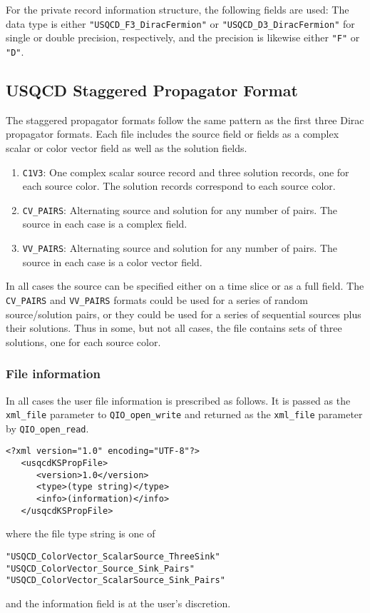 \documentclass{article}
\begin{document}
For the private record information structure, the following fields are
used: The data type is either \verb|"USQCD_F3_DiracFermion"| or
\verb|"USQCD_D3_DiracFermion"| for single or double precision,
respectively, and the precision is likewise either \verb|"F"| or
\verb|"D"|.

\subsection{USQCD Staggered Propagator Format}

The staggered propagator formats follow the same pattern as the first
three Dirac propagator formats.  Each file includes the source field
or fields as a complex scalar or color vector field as well as the
solution fields.
%
\begin{enumerate}
\item \verb|C1V3|: One complex scalar source record and three
  solution records, one for each source color.  The solution records
  correspond to each source color.
\item \verb|CV_PAIRS|: Alternating source and solution for any number
  of pairs.  The source in each case is a complex field.
\item \verb|VV_PAIRS|: Alternating source and solution for any number
  of pairs.  The source in each case is a color vector field.
\end{enumerate}
%
In all cases the source can be specified either on a time slice or as
a full field.  The \verb|CV_PAIRS| and \verb|VV_PAIRS| formats could
be used for a series of random source/solution pairs, or they could be
used for a series of sequential sources plus their solutions.  Thus in
some, but not all cases, the file contains sets of three solutions,
one for each source color.

\subsubsection{File information}

In all cases the user file information is prescribed as follows.  It
is passed as the \verb|xml_file| parameter to \verb|QIO_open_write| and
returned as the \verb|xml_file| parameter by \verb|QIO_open_read|.

\begin{verbatim}
<?xml version="1.0" encoding="UTF-8"?>
   <usqcdKSPropFile>
      <version>1.0</version>
      <type>(type string)</type>
      <info>(information)</info>
   </usqcdKSPropFile>
\end{verbatim}
%
where the file type string is one of
%
\begin{verbatim}
"USQCD_ColorVector_ScalarSource_ThreeSink"
"USQCD_ColorVector_Source_Sink_Pairs"
"USQCD_ColorVector_ScalarSource_Sink_Pairs"
\end{verbatim}
%
and the information field is at the user's discretion.
\end{document}
